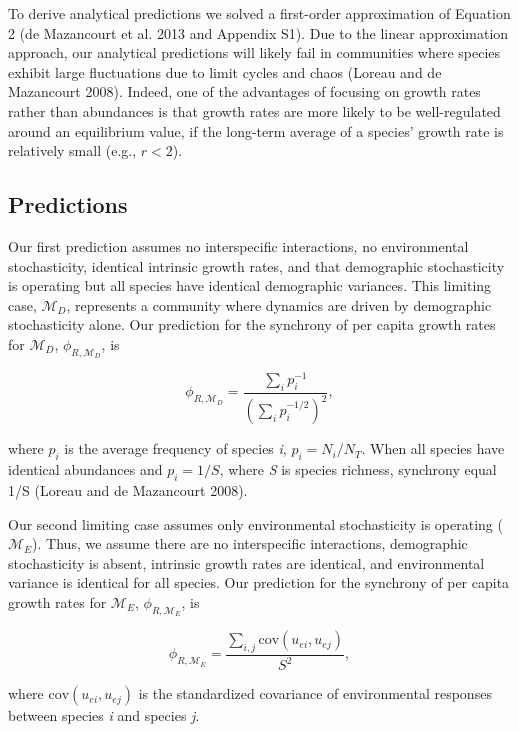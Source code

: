 \documentclass[11pt,]{article}
\begin{document}
To derive analytical predictions we solved a first-order approximation
of Equation 2 ({{de Mazancourt}} et al. 2013 and Appendix S1). Due to
the linear approximation approach, our analytical predictions will
likely fail in communities where species exhibit large fluctuations due
to limit cycles and chaos (Loreau and {{de Mazancourt}} 2008). Indeed,
one of the advantages of focusing on growth rates rather than abundances
is that growth rates are more likely to be well-regulated around an
equilibrium value, if the long-term average of a species' growth rate is
relatively small (e.g., \(r < 2\)).

\subsection{Predictions}

Our first prediction assumes no interspecific interactions, no
environmental stochasticity, identical intrinsic growth rates, and that
demographic stochasticity is operating but all species have identical
demographic variances. This limiting case, \(\mathcal{M}_{D}\),
represents a community where dynamics are driven by demographic
stochasticity alone. Our prediction for the synchrony of per capita
growth rates for \(\mathcal{M}_{D}\), \(\phi_{R,\mathcal{M}_{D}}\), is

\begin{equation}
\phi_{R,\mathcal{M}_{D}} = \frac{\sum_i p_i^{-1}}{\left(\sum_i p_i^{-1/2} \right)^2},
\end{equation}

\noindent where \(p_i\) is the average frequency of species \emph{i},
\(p_i = N_i/N_T\). When all species have identical abundances and
\(p_i = 1/S\), where \emph{S} is species richness, synchrony equal 1/S
(Loreau and {{de Mazancourt}} 2008).

Our second limiting case assumes only environmental stochasticity is
operating (\(\mathcal{M}_{E}\)). Thus, we assume there are no
interspecific interactions, demographic stochasticity is absent,
intrinsic growth rates are identical, and environmental variance is
identical for all species. Our prediction for the synchrony of per
capita growth rates for \(\mathcal{M}_{E}\),
\(\phi_{R,\mathcal{M}_{E}}\), is

\begin{equation}
\phi_{R,\mathcal{M}_{E}} = \frac{\sum_{i,j}\text{cov}(u_{ei},u_{ej})}{S^2},
\end{equation}

\noindent{} where \(\text{cov}(u_{ei},u_{ej})\) is the standardized
covariance of environmental responses between species \emph{i} and
species \emph{j}.
\end{document}
